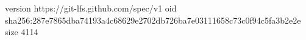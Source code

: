 version https://git-lfs.github.com/spec/v1
oid sha256:287e7865dba74193a4c68629e2702db726ba7e03111658c73c0f94c5fa3b2e2e
size 4114
